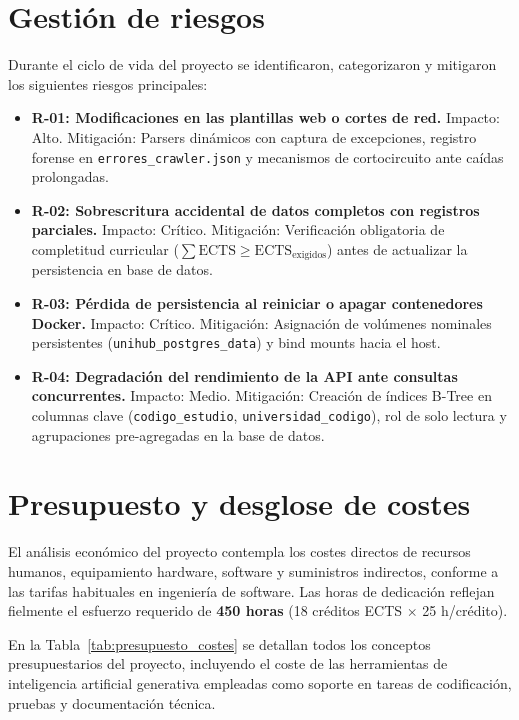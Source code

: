 \section{Gestión de riesgos}
Durante el ciclo de vida del proyecto se identificaron, categorizaron y mitigaron los siguientes riesgos principales:
\begin{itemize}
    \item \textbf{R-01: Modificaciones en las plantillas web o cortes de red.} Impacto: Alto. Mitigación: Parsers dinámicos con captura de excepciones, registro forense en \texttt{errores\_crawler.json} y mecanismos de cortocircuito ante caídas prolongadas.
    \item \textbf{R-02: Sobrescritura accidental de datos completos con registros parciales.} Impacto: Crítico. Mitigación: Verificación obligatoria de completitud curricular ($\sum \text{ECTS} \ge \text{ECTS}_{\text{exigidos}}$) antes de actualizar la persistencia en base de datos.
    \item \textbf{R-03: Pérdida de persistencia al reiniciar o apagar contenedores Docker.} Impacto: Crítico. Mitigación: Asignación de volúmenes nominales persistentes (\texttt{unihub\_postgres\_data}) y bind mounts hacia el host.
    \item \textbf{R-04: Degradación del rendimiento de la API ante consultas concurrentes.} Impacto: Medio. Mitigación: Creación de índices B-Tree en columnas clave (\texttt{codigo\_estudio}, \texttt{universidad\_codigo}), rol de solo lectura y agrupaciones pre-agregadas en la base de datos.
\end{itemize}

\section{Presupuesto y desglose de costes}
El análisis económico del proyecto contempla los costes directos de recursos humanos, equipamiento hardware, software y suministros indirectos, conforme a las tarifas habituales en ingeniería de software. Las horas de dedicación reflejan fielmente el esfuerzo requerido de \textbf{450 horas} (18 créditos ECTS $\times$ 25 h/crédito).

En la Tabla~\ref{tab:presupuesto_costes} se detallan todos los conceptos presupuestarios del proyecto, incluyendo el coste de las herramientas de inteligencia artificial generativa empleadas como soporte en tareas de codificación, pruebas y documentación técnica.

